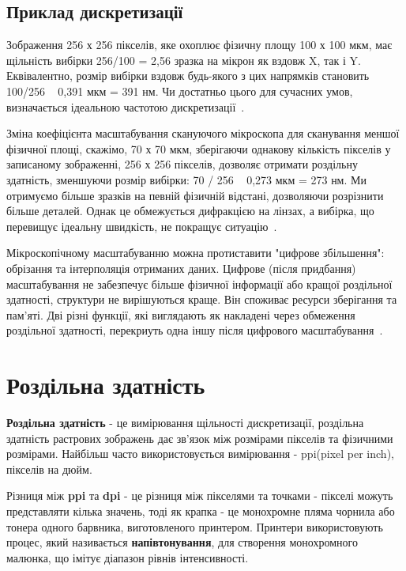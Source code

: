 \documentclass[a4paper,12pt]{article}
\begin{document}
    \subsection{Приклад дискретизації}\label{subsec:example_of_sampling}
    Зображення 256 х 256 пікселів, яке охоплює фізичну площу 100 х 100 мкм, має щільність вибірки 256/100 = 2,56 зразка на мікрон як вздовж X, так і Y.
    Еквівалентно, розмір вибірки вздовж будь-якого з цих напрямків становить 100/256 ~ 0,391 мкм = 391 нм.
    Чи достатньо цього для сучасних умов, визначається ідеальною частотою дискретизації~\cite{svi_sampling:3}.

    Зміна коефіцієнта масштабування скануючого мікроскопа для сканування меншої фізичної площі, скажімо, 70 х 70 мкм, зберігаючи однакову кількість пікселів у записаному зображенні, 256 х 256 пікселів, дозволяє отримати роздільну здатність, зменшуючи розмір вибірки: 70 / 256 ~ 0,273 мкм = 273 нм.
    Ми отримуємо більше зразків на певній фізичній відстані, дозволяючи розрізнити більше деталей.
    Однак це обмежується дифракцією на лінзах, а вибірка, що перевищує ідеальну швидкість, не покращує ситуацію~\cite{svi_sampling:3}.

    Мікроскопічному масштабуванню можна протиставити "цифрове збільшення": обрізання та інтерполяція отриманих даних.
    Цифрове (після придбання) масштабування не забезпечує більше фізичної інформації або кращої роздільної здатності, структури не вирішуються краще.
    Він споживає ресурси зберігання та пам'яті.
    Дві різні функції, які виглядають як накладені через обмеження роздільної здатності, перекриуть одна іншу після цифрового масштабування~\cite{svi_sampling:3}.


    \section{Роздільна здатність}\label{sec:resolution}
    \textbf{Роздільна здатність} - це вимірювання щільності дискретизації, роздільна здатність растрових зображень дає зв'язок між розмірами пікселів та фізичними розмірами.
    Найбільш часто використовується вимірювання - ppi(pixel per inch), пікселів на дюйм.

    Різниця між \textbf{ppi} та \textbf{dpi} - це різниця між пікселями та точками - пікселі можуть представляти кілька значень, тоді як крапка - це монохромне пляма чорнила або тонера одного барвника, виготовленого принтером.
    Принтери використовують процес, який називається \textbf{напівтонування}, для створення монохромного малюнка, що імітує діапазон рівнів інтенсивності.
\end{document}
